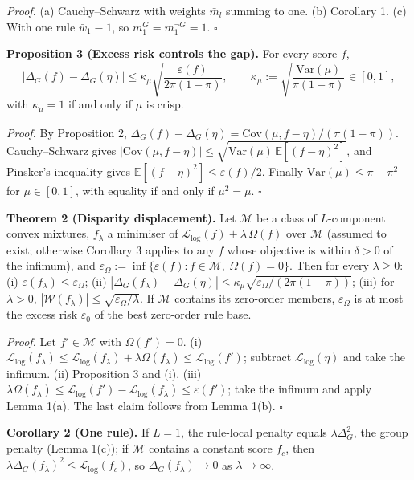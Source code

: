 \emph{Proof.} (a) Cauchy--Schwarz with weights \(\bar m_l\) summing to one. (b) Corollary 1. (c) With one rule \(\bar w_1 \equiv 1\), so \(m_1^G = m_1^{\neg G} = 1\). \(\square\)

\textbf{Proposition 3 (Excess risk controls the gap).} For every score \(f\), \[|\Delta_{G}(f) - \Delta_{G}(\eta)| \leq \kappa_{\mu}\sqrt{\frac{\varepsilon(f)}{2\pi(1 - \pi)}},\qquad \kappa_{\mu} := \sqrt{\frac{\mathrm{Var}(\mu)}{\pi(1 - \pi)}} \in [0,1], \tag{6}\] with \(\kappa_{\mu} = 1\) if and only if \(\mu\) is crisp.

\emph{Proof.} By Proposition 2, \(\Delta_{G}(f) - \Delta_{G}(\eta) = \mathrm{Cov}(\mu,f - \eta)/(\pi(1 - \pi))\). Cauchy--Schwarz gives \(|\mathrm{Cov}(\mu,f - \eta)| \leq \sqrt{\mathrm{Var}(\mu)\,\mathbb{E}[(f - \eta)^{2}]}\), and Pinsker's inequality \cite{cover} gives \(\mathbb{E}[(f - \eta)^{2}] \leq \varepsilon(f)/2\). Finally \(\mathrm{Var}(\mu) \leq \pi - \pi^{2}\) for \(\mu \in [0,1]\), with equality if and only if \(\mu^2 = \mu\). \(\square\)

\textbf{Theorem 2 (Disparity displacement).} Let \(\mathcal{M}\) be a class of \(L\)-component convex mixtures, \(f_{\lambda}\) a minimiser of \(\mathcal{L}_{\log}(f) + \lambda\,\Omega(f)\) over \(\mathcal{M}\) (assumed to exist; otherwise Corollary 3 applies to any \(f\) whose objective is within \(\delta > 0\) of the infimum), and \(\varepsilon_{\Omega} := \inf\{\varepsilon(f): f \in \mathcal{M},\ \Omega(f) = 0\}\). Then for every \(\lambda \geq 0\): (i) \(\varepsilon(f_{\lambda}) \leq \varepsilon_{\Omega}\); (ii) \(|\Delta_{G}(f_{\lambda}) - \Delta_{G}(\eta)| \leq \kappa_{\mu}\sqrt{\varepsilon_{\Omega}/(2\pi(1 - \pi))}\); (iii) for \(\lambda > 0\), \(|\mathcal{W}(f_{\lambda})| \leq \sqrt{\varepsilon_{\Omega}/\lambda}\). If \(\mathcal{M}\) contains its zero-order members, \(\varepsilon_{\Omega}\) is at most the excess risk \(\varepsilon_{0}\) of the best zero-order rule base.

\emph{Proof.} Let \(f' \in \mathcal{M}\) with \(\Omega(f') = 0\). (i) \(\mathcal{L}_{\log}(f_{\lambda}) \leq \mathcal{L}_{\log}(f_{\lambda}) + \lambda\Omega(f_\lambda) \leq \mathcal{L}_{\log}(f')\); subtract \(\mathcal{L}_{\log}(\eta)\) and take the infimum. (ii) Proposition 3 and (i). (iii) \(\lambda\Omega(f_{\lambda}) \leq \mathcal{L}_{\log}(f') - \mathcal{L}_{\log}(f_\lambda) \leq \varepsilon(f')\); take the infimum and apply Lemma 1(a). The last claim follows from Lemma 1(b). \(\square\)

\textbf{Corollary 2 (One rule).} If \(L = 1\), the rule-local penalty equals \(\lambda\Delta_G^2\), the group penalty (Lemma 1(c)); if \(\mathcal M\) contains a constant score \(f_c\), then \(\lambda\Delta_{G}(f_\lambda)^2 \le \mathcal{L}_{\log}(f_c)\), so \(\Delta_{G}(f_\lambda) \to 0\) as \(\lambda \to \infty\).

